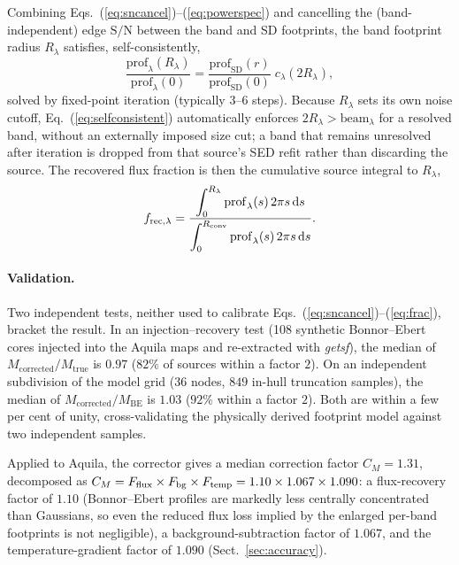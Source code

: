 \documentclass[11pt,a4paper]{article}
\begin{document}
Combining Eqs.~(\ref{eq:sncancel})--(\ref{eq:powerspec}) and cancelling the
(band-independent) edge $\mathrm{S/N}$ between the band and SD footprints, the
band footprint radius $R_\lambda$ satisfies, self-consistently,
\begin{equation}
  \frac{\mathrm{prof}_\lambda(R_\lambda)}{\mathrm{prof}_\lambda(0)}
    = \frac{\mathrm{prof}_{\mathrm{SD}}(r)}{\mathrm{prof}_{\mathrm{SD}}(0)}\;
      c_\lambda(2R_\lambda),
  \label{eq:selfconsistent}
\end{equation}
solved by fixed-point iteration (typically $3$--$6$ steps). Because $R_\lambda$
sets its own noise cutoff, Eq.~(\ref{eq:selfconsistent}) automatically
enforces $2R_\lambda>\mathrm{beam}_\lambda$ for a resolved band, without an
externally imposed size cut; a band that remains unresolved after iteration is
dropped from that source's SED refit rather than discarding the source. The
recovered flux fraction is then the cumulative source integral to
$R_\lambda$,
\begin{equation}
  f_{\mathrm{rec},\lambda} = \frac{\displaystyle\int_0^{R_\lambda}
    \mathrm{prof}_\lambda(s)\,2\pi s\,\mathrm{d}s}
    {\displaystyle\int_0^{R_{\rm conv}} \mathrm{prof}_\lambda(s)\,2\pi s\,
     \mathrm{d}s}.
  \label{eq:frac}
\end{equation}

\paragraph{Validation.} Two independent tests, neither used to calibrate
Eqs.~(\ref{eq:sncancel})--(\ref{eq:frac}), bracket the result. In an
injection--recovery test (108 synthetic Bonnor--Ebert cores injected into the
Aquila maps and re-extracted with \emph{getsf}), the median of
$M_{\mathrm{corrected}}/M_{\mathrm{true}}$ is $0.97$ ($82\%$ of sources within
a factor $2$). On an independent subdivision of the model grid (36 nodes,
$849$ in-hull truncation samples), the median of
$M_{\mathrm{corrected}}/M_{\mathrm{BE}}$ is $1.03$ ($92\%$ within a factor
$2$). Both are within a few per cent of unity, cross-validating the
physically derived footprint model against two independent samples.

Applied to Aquila, the corrector gives a median correction factor
$C_M=1.31$, decomposed as $C_M = F_{\rm flux}\times F_{\rm bg}\times
F_{\rm temp} = 1.10\times1.067\times1.090$: a flux-recovery factor of
$1.10$ (Bonnor--Ebert profiles are markedly less centrally concentrated than
Gaussians, so even the reduced flux loss implied by the enlarged per-band
footprints is not negligible), a background-subtraction factor of $1.067$,
and the temperature-gradient factor of $1.090$ (Sect.~\ref{sec:accuracy}).
\end{document}
